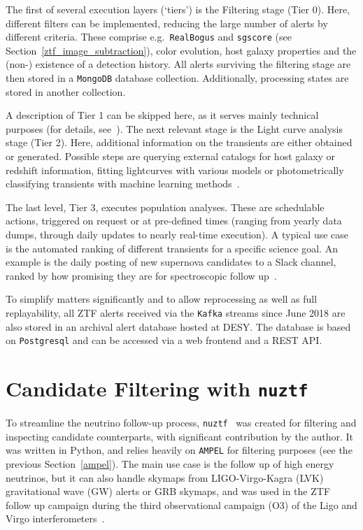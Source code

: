 The first of several execution layers (`tiers') is the Filtering stage (Tier 0). Here, different filters can be implemented, reducing the large number of alerts by different criteria. These comprise e.g.\ \texttt{RealBogus} and \texttt{sgscore} (see Section~\ref{ztf_image_subtraction}), color evolution, host galaxy properties and the (non-) existence of a detection history. All alerts surviving the filtering stage are then stored in a \texttt{MongoDB} database collection. Additionally, processing states are stored in another collection.

A description of Tier 1 can be skipped here, as it serves mainly technical purposes (for details, see~\cite{Nordin2019}). The next relevant stage is the Light curve analysis stage (Tier 2). Here, additional information on the transients are either obtained or generated. Possible steps are querying external catalogs for host galaxy or redshift information, fitting lightcurves with various models or photometrically classifying transients with machine learning methods~\cite{Nordin2019}.

The last level, Tier 3, executes population analyses. These are schedulable actions, triggered on request or at pre-defined times (ranging from yearly data dumps, through daily updates to nearly real-time execution). A typical use case is the automated ranking of different transients for a specific science goal. An example is the daily posting of new supernova candidates to a Slack channel, ranked by how promising they are for spectroscopic follow up~\cite{Nordin2019}.

To simplify matters significantly and to allow reprocessing as well as full replayability, all ZTF alerts received via the \texttt{Kafka} streams since June 2018 are also stored in an archival alert database hosted at DESY. The database is based on \texttt{Postgresql} and can be accessed via a web frontend and a REST API.

\section{Candidate Filtering with \texttt{nuztf}}
To streamline the neutrino follow-up process, \texttt{nuztf}~ was created for filtering and inspecting candidate counterparts, with significant contribution by the author. It was written in Python, and relies heavily on \texttt{AMPEL} for filtering purposes (see the previous Section~\ref{ampel}). The main use case is the follow up of high energy neutrinos, but it can also handle skymaps from LIGO-Virgo-Kagra (LVK) gravitational wave (GW) alerts or GRB skymaps, and was used in the ZTF follow up campaign during the third observational campaign (O3) of the Ligo and Virgo interferometers~\cite{Kasliwal2020}.

